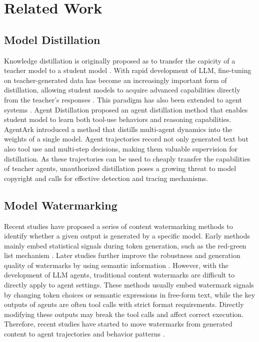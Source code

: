

\section{Related Work}

\subsection{Model Distillation}
Knowledge distillation is originally proposed as to transfer the capicity of a teacher model to a student model \cite{hinton2015distilling}. With rapid development of LLM, fine-tuning on teacher-generated data has become an increasingly important form of distillation, allowing student models to acquire advanced capabilities directly from the teacher's responses \cite{hsieh2023distilling, mukherjee2023orca}. This paradigm has also been extended to agent systems \cite{kang2026distilling, liu2026structured, luo2026agentark}. Agent Distillation \cite{kang2026distilling} proposed an agent distillation method that enables student model to learn both tool-use behaviors and reasoning capabilities. AgentArk \cite{luo2026agentark} introduced a method that distills multi-agent dynamics into the weights of a single model. Agent trajectories record not only generated text but also tool use and multi-step decisions, making them valuable supervision for distillation. As these trajectories can be used to cheaply transfer the capabilities of teacher agents, unauthorized distillation poses a growing threat to model copyright and calls for effective detection and tracing mechanisms.


\subsection{Model Watermarking}



Recent studies have proposed a series of content watermarking methods to identify whether a given output is generated by a specific model. Early methods mainly embed statistical signals during token generation, such as the red-green list mechanism \cite{kirchenbauer2023watermark}. Later studies further improve the robustness and generation quality of watermarks by using semantic information \cite{liu2024semantic, huo2026pmark, huo2026samark,hou2024semstamp}. However, with the development of LLM agents, traditional content watermarks are difficult to directly apply to agent settings. These methods usually embed watermark signals by changing token choices or semantic expressions in free-form text, while the key outputs of agents are often tool calls with strict format requirements. Directly modifying these outputs may break the tool calls and affect correct execution. Therefore, recent studies have started to move watermarks from generated content to agent trajectories and behavior patterns \cite{huang2025agent, an2026sequential, zhang2026memmark}.


